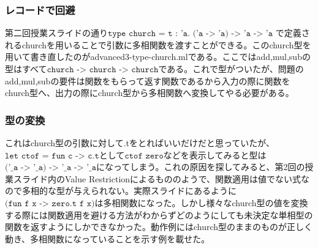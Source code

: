 \documentclass[11pt,a4paper]{jsarticle}
\begin{document}
\subsubsection*{レコードで回避}
第二回授業スライドの通り$\texttt{type\ church\ =\ {t\ :\ 'a.\ ('a\ ->\ 'a)\ ->\ 'a\ ->\ 'a\ }}$で定義されるchurchを用いることで引数に多相関数を渡すことができる。このchurch型を用いて書き直したのがadvanced3-type-church.mlである。ここではadd,mul,subの型はすべて$\texttt{church\ ->\ church\ ->\ church}$である。これで型がついたが、問題のadd,mul,subの要件は関数をもらって返す関数であるから入力の際に関数をchurch型へ、出力の際にchurch型から多相関数へ変換してやる必要がある。
\subsubsection*{型の変換}
これはchurch型の引数に対して.tをとればいいだけだと思っていたが、$\texttt{let\ ctof\ =\ fun\ c\ ->\ c.t}$として$\texttt{ctof\ zero}$などを表示してみると型は$\texttt{('\_a\ ->\ '\_a)\ ->\ '\_a\ ->\ '\_a}$になってしまう。これの原因を探してみると、第2回の授業スライド内のValue Restrictionによるもののようで、関数適用は値でない式なので多相的な型が与えられない。実際スライドにあるように$\texttt{(fun\ f\ x\ ->\ zero.t\ f\ x)}$は多相関数になった。しかし様々なchurch型の値を変換する際には関数適用を避ける方法がわからずどのようにしても未決定な単相型の関数を返すようにしかできなかった。動作例にはchurch型のままのものが正しく動き、多相関数になっていることを示す例を載せた。
\end{document}

